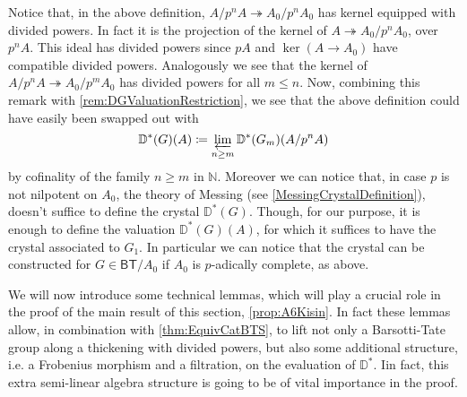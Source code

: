 \begin{rem}[]\label{rem:NonNilpotentCrystalEvaluation}
	Notice that, in the above definition, $A/p^nA \twoheadrightarrow A_0/p^nA_0$
	has kernel equipped with divided powers.
	In fact it is the projection of the kernel of $A \twoheadrightarrow A_0/p^nA_0$, over
	$p^nA$.
	This ideal has divided powers since $pA$ and $\ker (A \to A_0)$ have compatible
	divided powers.
	Analogously we see that the kernel of $A/p^nA \twoheadrightarrow A_0/p^mA_0$
	has divided powers for all $m \leq n$.
	Now, combining this remark with \cref{rem:DGValuationRestriction},
	we see that the above definition could have easily been swapped out with
	\begin{equation*}
		\mathbb{D}^*(G)(A) \coloneqq
		\varprojlim_{n \geq m} \mathbb{D}^*(G_m)(A/p^nA)
	\end{equation*}
	by cofinality of the family $n \geq m$ in $\mathbb{N}$.
	Moreover we can notice that, in case $p$ is not nilpotent
	on $A_0$, the theory of Messing (see \cref{MessingCrystalDefinition}),
	doesn't suffice to define the crystal $\mathbb{D}^*(G)$.
	Though, for our purpose, it is enough to define the valuation $\mathbb{D}^*(G)(A)$,
	for which it suffices to have the crystal associated to $G_1$.
	In particular we can notice that the crystal can be constructed for
	$G \in \mathsf{BT}/A_0$ if $A_0$ is $p$-adically complete, as above.
\end{rem}


\begin{rem}[]
	We will now introduce some technical lemmas, which will play a crucial role
	in the proof of the main result of this section, \cref{prop:A6Kisin}.
	In fact these lemmas allow, in combination with \cref{thm:EquivCatBTS},
	to lift not only a Barsotti-Tate group along a thickening with divided
	powers, but also some additional structure, i.e.
	a Frobenius morphism and a filtration, on the evaluation of $\mathbb{D}^*$.
	Iin fact, this extra semi-linear algebra structure is going to 
	be of vital importance in the proof.
\end{rem}


